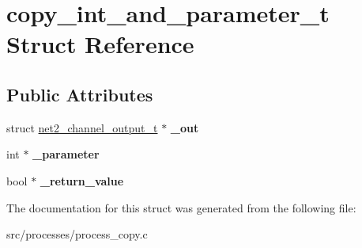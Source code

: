 \hypertarget{structcopy__int__and__parameter__t}{}\section{copy\+\_\+int\+\_\+and\+\_\+parameter\+\_\+t Struct Reference}
\label{structcopy__int__and__parameter__t}
\subsection*{Public Attributes}
\begin{DoxyCompactItemize}
\item 
\hypertarget{structcopy__int__and__parameter__t_a9775d5ac5976ceaf38b2719f455b7b42}{}struct \hyperlink{structnet2__channel__output__t}{net2\+\_\+channel\+\_\+output\+\_\+t} $\ast$ {\bfseries \+\_\+out}\label{structcopy__int__and__parameter__t_a9775d5ac5976ceaf38b2719f455b7b42}

\item 
\hypertarget{structcopy__int__and__parameter__t_a6c9f9f3e8d273fc0a2336c0e900fb382}{}int $\ast$ {\bfseries \+\_\+parameter}\label{structcopy__int__and__parameter__t_a6c9f9f3e8d273fc0a2336c0e900fb382}

\item 
\hypertarget{structcopy__int__and__parameter__t_ae95f1f2df8e9877a563fe27fc3b0ca28}{}bool $\ast$ {\bfseries \+\_\+return\+\_\+value}\label{structcopy__int__and__parameter__t_ae95f1f2df8e9877a563fe27fc3b0ca28}

\end{DoxyCompactItemize}


The documentation for this struct was generated from the following file\+:\begin{DoxyCompactItemize}
\item 
src/processes/process\+\_\+copy.\+c\end{DoxyCompactItemize}
